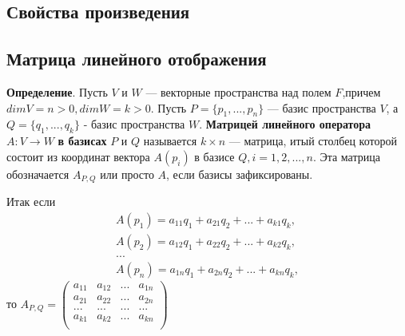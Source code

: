 \documentclass[a4paper]{article}
\begin{document}
    \subsection*{Свойства произведения}

    \newpage \begin{center}
                 \begin{Large}
                 \end{Large}
    \end{center}
    \subsection*{Матрица линейного отображения}

    \textbf{Определение}. Пусть $V$ и $W$ --- векторные пространства над полем $F$,\newline причем $dim V = n>0, dim W = k > 0$. Пусть $P = \{ p_1, ..., p_n \}$ --- базис пространства $V$, а $Q = \{ q_1, ..., q_k \}$ - базис пространства $W$. \textbf{Матрицей линейного оператора } $A: V \rightarrow W$ \textbf{в базисах} $P$ и $Q$ называется $k \times n$ --- матрица, итый столбец которой состоит из координат вектора $A(p_i)$ в базисе $Q, i = 1, 2, ..., n$. Эта матрица обозначается $A_{P,Q}$ или просто $A$, если базисы зафиксированы.

    Итак если \begin{equation}
                  \begin{matrix}
                      A(p_1) = a_{11}q_1 + a_{21}q_2 + ... + a_{k1}q_k, \\
                      A(p_2) = a_{12}q_1 + a_{22}q_2 + ... + a_{k2}q_k, \\
                      ...                                               \\
                      A(p_n) = a_{1n}q_1 + a_{2n}q_2 + ... + a_{kn}q_k,
                  \end{matrix}
    \end{equation}
    то $\displaystyle A_{P,Q} = \begin{pmatrix}
                                    a_{11} & a_{12} & ... & a_{1n} \\
                                    a_{21} & a_{22} & ... & a_{2n} \\
                                    ...    & ...    & ... & ...    \\
                                    a_{k1} & a_{k2} & ... & a_{kn} \\
    \end{pmatrix}$
\end{document}
